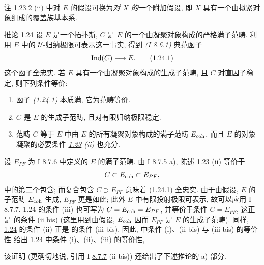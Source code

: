 \begin{enonce*}[remark]{注 1.23.2}
(ii) 中对 $E$ 的假设可换为\emph{对 $X$ 的}一个附加假设,
即 $X$ 具有一个由拟紧对象组成的覆盖族基本系.
\end{enonce*}

\begin{enonce*}{推论 1.24}
设\pageoriginale{} $E$ 是一个拓扑斯,
$C$ 是 $E$ 的一个由凝聚对象构成的严格满子范畴.
利用 $E$ 中的 $𝒰$-归纳极限可表示这一事实,
得到 \emph{(I \hyperref[I.sec8.6.1]{8.6.1})} 典范函子
\begin{equation*}
\Ind (C) \to E{\quoi}.\tag{1.24.1}
\end{equation*}
这个函子全忠实.
若 $E$ 具有一个由凝聚对象构成的生成子范畴,
且 $C$ 对直因子稳定, 则下列条件等价:
\begin{enumerate}
\renewcommand{\theenumi}{\roman{enumi}}
\renewcommand{\labelenumi}{(\theenumi)}
\item 函子 \emph{\hyperref[VI.eq1.24.1]{(1.24.1)}} 本质满,
\ie 它为范畴等价.

\item $C$ 是 $E$ 的生成子范畴, 且对有限归纳极限稳定.

\item 范畴 $C$ 等于 $E$ 中由 $E$ 的所有凝聚对象构成的满子范畴 $E_{\mathrm{coh}}$,
而且 $E$ 的对象凝聚的必要条件
\emph{\hyperref[VI.thm1.23]{1.23} (ii)} 也充分.
\end{enumerate}
\end{enonce*}

设 $E_{PF}$ 为 I \hyperref[I.cor8.7.6]{8.7.6} 中定义的 $E$ 的满子范畴.
由 I \hyperref[I.prop8.7.5]{8.7.5} a),
陈述 \hyperref[VI.thm1.23]{1.23} (ii) 等价于
$$
C \subset E_{\mathrm{coh}} \subset E_{PF}{},
$$
中的第二个包含;
而复合包含 $C\supset E_{PF}$ 意味着
\hyperref[VI.eq1.24.1]{(1.24.1)} 全忠实.
由于\pageoriginale{}由假设, $E$ 的子范畴 $E_{\mathrm{coh}}$ 生成,
$E_{PF}$ 更是如此;
此外 $E$ 中有限投射极限可表示,
故可以应用 I \hyperref[I.cor8.7.7]{8.7.7}.
\hyperref[VI.cor1.24]{1.24} 的条件 (iii)
也可写为 $C=E_{\mathrm{coh}}=E_{PF}$,
并等价于条件 $C=E_{PF}$,
这正是 \loccit{} 的条件 (ii bis)
(这里用到由假设, $E_{\mathrm{coh}}$
因而 $E_{PF}$ 是 $E$ 的生成子范畴).
同样, \hyperref[VI.cor1.24]{1.24} 的条件 (ii)
正是 \loccit{} 的条件 (iii bis).
因此, \loccit{} 中条件 (i)、(ii bis) 与 (iii bis) 的等价性
给出 \hyperref[VI.cor1.24]{1.24} 中条件 (i)、(ii)、(iii) 的等价性, \cqfd

该证明 (更确切地说,
引用 I \hyperref[I.cor8.7.7]{8.7.7} (ii bis)) 还给出了下述推论的 a) 部分.

